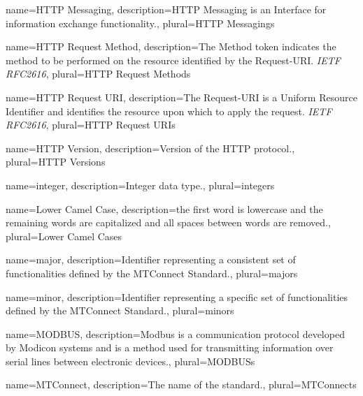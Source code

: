{
    name={HTTP Messaging},
	description={\gls{HTTP Messaging} is an \gls{Interface} for information exchange functionality.},
	plural={HTTP Messagings}
}

{
    name={HTTP Request Method},
	description={The Method  token indicates the method to be performed on the resource identified by the Request-URI. \textit{IETF RFC2616}},
	plural={HTTP Request Methods}
}

{
    name={HTTP Request URI},
	description={The Request-URI is a Uniform Resource Identifier and identifies the resource upon which to apply the request. \textit{IETF RFC2616}},
	plural={HTTP Request URIs}
}

{
    name={HTTP Version},
	description={Version of the HTTP protocol.},
	plural={HTTP Versions}
}

{
    name={integer},
	description={Integer data type.},
	plural={integers}
}

{
    name={Lower Camel Case},
	description={the first word is lowercase and the remaining words are capitalized and all spaces between words are removed.},
	plural={Lower Camel Cases}
}

{
    name={major},
	description={Identifier representing a consistent set of functionalities defined by the MTConnect Standard.},
	plural={majors}
}

{
    name={minor},
	description={Identifier representing a specific set of functionalities defined by the MTConnect Standard.},
	plural={minors}
}

{
    name={MODBUS},
	description={Modbus is a communication protocol developed by Modicon systems and is a method used for transmitting information over serial lines between electronic devices.},
	plural={MODBUSs}
}

{
    name={MTConnect},
	description={The name of the standard.},
	plural={MTConnects}
}

